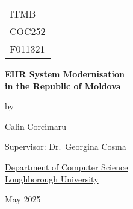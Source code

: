 

\thispagestyle{empty}

\fancypage{}{\fbox}

\begin{center}

\Large{
\hfill \begin{tabular}{l}
ITMB \\
COC252 \\
F011321
\end{tabular}
}


\vspace*{\fill}

\Large{\textbf{EHR System Modernisation \\
in the Republic of Moldova}}

\vspace*{\fill}

by

\vspace*{\fill}

Calin Corcimaru


\vspace*{\fill}
Supervisor: Dr.\ Georgina Cosma
\vspace*{\fill}

\underline{Department of Computer Science} \\
\underline{Loughborough University}

\vspace*{\fill}
May 2025

\end{center}


\fancypage{}{}



